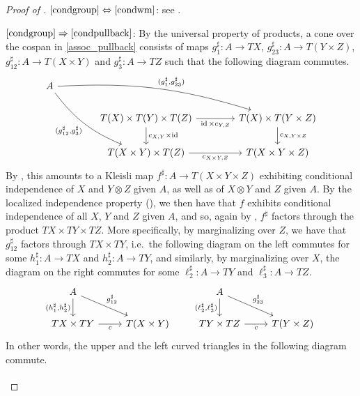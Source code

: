 \documentclass[a4paper,UKenglish,numberwithinsect,cleveref, autoref, thm-restate]{lipics-v2021}
\theoremstyle{plain} %
\theoremstyle{definition} %
\begin{document}
\begin{proof}[Proof of ]
 $\ref{condgroup}\Leftrightarrow\ref{condwm}$: 
 see .
 
 $\ref{condgroup}\Rightarrow\ref{condpullback}$: 
 By the universal property of products, a cone over the cospan in \eqref{assoc_pullback} consists of maps $g_1^\sharp:A\to TX$, $g_{23}^\sharp:A\to T(Y\times Z)$, $g_{12}^\sharp:A\to T(X\times Y)$ and $g_3^\sharp:A\to TZ$ such that the following diagram commutes. 
 \[
  \begin{tikzcd}[column sep=3.3pc]
   A \ar[bend left=10]{drr}{(g_1^\sharp,g_{23}^\sharp)} \ar[bend right=15]{ddr}[swap]{(g_{12}^\sharp,g_3^\sharp)} \\
   & T(X) \times T(Y) \times T(Z) \ar{r}[swap]{\id \times c_{Y,Z}} \ar{d}{c_{X,Y} \times \id}	& T(X) \times T(Y \times Z) \ar{d}{c_{X,Y \times Z}}	\\
   & T(X \times Y) \times T(Z) \ar{r}[swap]{c_{X\times Y,Z}}						& T(X \times Y \times Z)
  \end{tikzcd}
 \]
 By , this amounts to a Kleisli map $f^\sharp:A\to T(X\times Y\times Z)$ exhibiting conditional independence of $X$ and $Y\otimes Z$ given $A$, as well as of $X\otimes Y$ and $Z$ given $A$. By the localized independence property (), we then have that $f$ exhibits conditional independence of all $X$, $Y$ and $Z$ given $A$, and so, again by , $f^\sharp$ factors through the product $TX\times TY\times TZ$. 
 More specifically, by marginalizing over $Z$, we have that $g_{12}^\sharp$ factors through $TX\times TY$, i.e.~the following diagram on the left commutes for some $h_1^\sharp:A\to TX$ and $h_2^\sharp:A\to TY$, and similarly, by marginalizing over $X$, the diagram on the right commutes for some $\ell_2^\sharp:A\to TY$ and $\ell_3^\sharp:A\to TZ$.
 \[
  \begin{tikzcd}
   A \ar{d}[swap]{(h_1^\sharp,h_2^\sharp)} \ar{dr}{g_{12}^\sharp} \\
   TX\times TY \ar{r}[swap]{c} & T(X\times Y) 
  \end{tikzcd}
  \qquad
  \begin{tikzcd}
   A \ar{d}[swap]{(\ell_2^\sharp,\ell_3^\sharp)} \ar{dr}{g_{23}^\sharp} \\
   TY\times TZ \ar{r}[swap]{c} & T(Y\times Z) 
  \end{tikzcd}
 \]
 In other words, the upper and the left curved triangles in the following diagram commute.
\[
  \begin{tikzcd}[column sep=3.3pc]

\end{tikzcd}\]
\end{proof}
\end{document}
